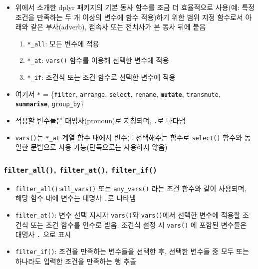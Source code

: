\documentclass[
  11pt,
]{krantz}
\makeatletter
\providecommand{\tightlist}{%
  \setlength{\itemsep}{0pt}\setlength{\parskip}{0pt}}
\newenvironment{kframe}{%
\medskip{}
\setlength{\fboxsep}{.8em}
 \def\at@end@of@kframe{}%
 \ifinner\ifhmode%
  \def\at@end@of@kframe{\end{minipage}}%
  \begin{minipage}{\columnwidth}%
 \fi\fi%
 \def\FrameCommand##1{\hskip\@totalleftmargin \hskip-\fboxsep
 \colorbox{shadecolor}{##1}\hskip-\fboxsep
     \hskip-\linewidth \hskip-\@totalleftmargin \hskip\columnwidth}%
 \MakeFramed {\advance\hsize-\width
   \@totalleftmargin\z@ \linewidth\hsize
   \@setminipage}}%
 {\par\unskip\endMakeFramed%
 \at@end@of@kframe}
\renewenvironment{quote}{\begin{kframe}}{\end{kframe}}
\makeatother
\begin{document}
\begin{itemize}
\item
  위에서 소개한 dplyr 패키지의 기본 동사 함수를 조금 더 효율적으로 사용(예: 특정 조건을 만족하는 두 개 이상의 변수에 함수 적용)하기 위한 범위 지정 함수로서 아래와 같은 부사(adverb), 접속사 또는 전치사가 본 동사 뒤에 붙음

  \begin{enumerate}
  \def\labelenumi{\alph{enumi}.}
  \tightlist
  \item
    \texttt{*\_all}: 모든 변수에 적용
  \item
    \texttt{*\_at}: \texttt{vars()} 함수를 이용해 선택한 변수에 적용
  \item
    \texttt{*\_if}: 조건식 또는 조건 함수로 선택한 변수에 적용
  \end{enumerate}
\item
  여기서 \texttt{*} = \{\texttt{filter}, \texttt{arrange}, \texttt{select}, \texttt{rename}, \textbf{\texttt{mutate}}, \texttt{transmute}, \textbf{\texttt{summarise}}, \texttt{group\_by}\}
\item
  적용할 변수들은 대명사(pronoun)로 지칭되며, \texttt{.}로 나타냄
\item
  \texttt{vars()}는 \texttt{*\_at} 계열 함수 내에서 변수를 선택해주는 함수로 \texttt{select()} 함수와 동일한 문법으로 사용 가능(단독으로는 사용하지 않음)
\end{itemize}

\hypertarget{filter-variant}{%
\subsubsection*{\texorpdfstring{\texttt{filter\_all()}, \texttt{filter\_at()}, \texttt{filter\_if()}}{filter\_all(), filter\_at(), filter\_if()}}\label{filter-variant}}


\begin{quote}
\begin{itemize}
\tightlist
\item
  \texttt{filter\_all()}:\texttt{all\_vars()} 또는 \texttt{any\_vars()} 라는 조건 함수와 같이 사용되며, 해당 함수 내에 변수는 대명사 \texttt{.}로 나타냄
\item
  \texttt{filter\_at()}: 변수 선택 지시자 \texttt{vars()}와 \texttt{vars()}에서 선택한 변수에 적용할 조건식 또는 조건 함수를 인수로 받음. 조건식 설정 시 \texttt{vars()} 에 포함된 변수들은 대명사 \texttt{.} 으로 표시
\item
  \texttt{filter\_if()}: 조건을 만족하는 변수들을 선택한 후, 선택한 변수들 중 모두 또는 하나라도 입력한 조건을 만족하는 행 추출
\end{itemize}
\end{quote}
\end{document}
